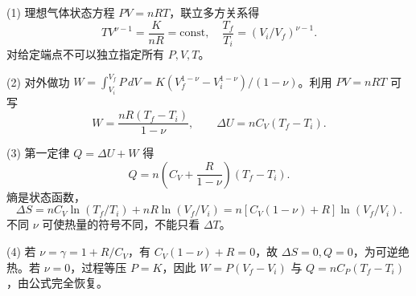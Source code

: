 (1) 理想气体状态方程 \(PV=nRT\)，联立多方关系得
\[
TV^{\nu-1}=\frac K{nR}=\mathrm{const},\quad
\frac{T_f}{T_i}=(V_i/V_f)^{\nu-1}.
\]
对给定端点不可以独立指定所有 \(P,V,T\)。

(2) 对外做功 \(W=\int_{V_i}^{V_f}P\,dV=K(V_f^{1-\nu}-V_i^{1-\nu})/(1-\nu)\)。利用 \(PV=nRT\) 可写
\[
W=\frac{nR(T_f-T_i)}{1-\nu},\qquad
\Delta U=nC_V(T_f-T_i).
\]

(3) 第一定律 \(Q=\Delta U+W\) 得
\[
Q=n\left(C_V+\frac R{1-\nu}\right)(T_f-T_i).
\]
熵是状态函数，
\[
\Delta S=nC_V\ln(T_f/T_i)+nR\ln(V_f/V_i)
=n[C_V(1-\nu)+R]\ln(V_f/V_i).
\]
不同 \(\nu\) 可使热量的符号不同，不能只看 \(\Delta T\)。

(4) 若 \(\nu=\gamma=1+R/C_V\)，有 \(C_V(1-\nu)+R=0\)，故 \(\Delta S=0,Q=0\)，为可逆绝热。若 \(\nu=0\)，过程等压 \(P=K\)，因此 \(W=P(V_f-V_i)\) 与 \(Q=nC_P(T_f-T_i)\)，由公式完全恢复。
